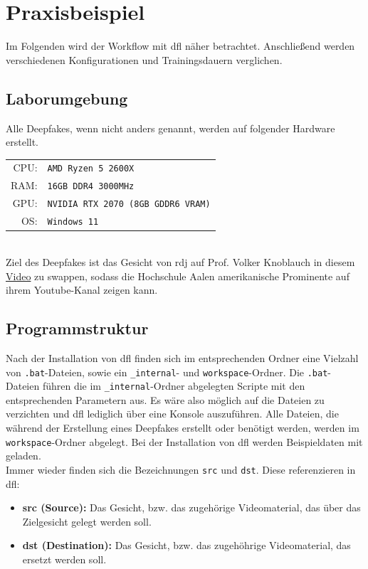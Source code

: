 \section{Praxisbeispiel}\label{sec:praxisbeispiel}
Im Folgenden wird der Workflow mit \gls{dfl} näher betrachtet.
Anschließend werden verschiedenen Konfigurationen und Trainingsdauern verglichen.

\subsection{Laborumgebung}\label{subsec:laborumgebung}
Alle Deepfakes, wenn nicht anders genannt, werden auf folgender Hardware erstellt.\\[0.5cm]
\begin{tabular}{rl}
    CPU:& \texttt{AMD Ryzen 5 2600X}\\
    RAM:& \texttt{16GB DDR4 3000MHz}\\
    GPU:& \texttt{NVIDIA RTX 2070 (8GB GDDR6 VRAM)}\\
    OS:& \texttt{Windows 11}
\end{tabular}\\[0.5cm]

Ziel des Deepfakes ist das Gesicht von \gls{rdj} auf Prof. Volker Knoblauch in diesem \href{https://www.youtube.com/watch?v=rksMPlRSbQU}{Video} zu swappen,
sodass die Hochschule Aalen amerikanische Prominente auf ihrem Youtube-Kanal zeigen kann.

\subsection{Programmstruktur}\label{subsec:programmstruktur}
Nach der Installation von \gls{dfl} finden sich im entsprechenden Ordner eine Vielzahl von \texttt{.bat}-Dateien, sowie ein \texttt{\_internal}- und \texttt{workspace}-Ordner.
Die \texttt{.bat}-Dateien führen die im \texttt{\_internal}-Ordner abgelegten Scripte mit den entsprechenden Parametern aus.
Es wäre also möglich auf die Dateien zu verzichten und \gls{dfl} lediglich über eine Konsole auszuführen.
Alle Dateien, die während der Erstellung eines Deepfakes erstellt oder benötigt werden, werden im \texttt{workspace}-Ordner abgelegt.
Bei der Installation von \gls{dfl} werden Beispieldaten mit geladen.\\

Immer wieder finden sich die Bezeichnungen \texttt{src} und \texttt{dst}.
Diese referenzieren in \gls{dfl}:
\begin{itemize}
    \item \textbf{src (Source):} Das Gesicht, bzw. das zugehörige Videomaterial, das über das Zielgesicht gelegt werden soll.
    \item \textbf{dst (Destination):} Das Gesicht, bzw. das zugehöhrige Videomaterial, das ersetzt werden soll.
\end{itemize}

